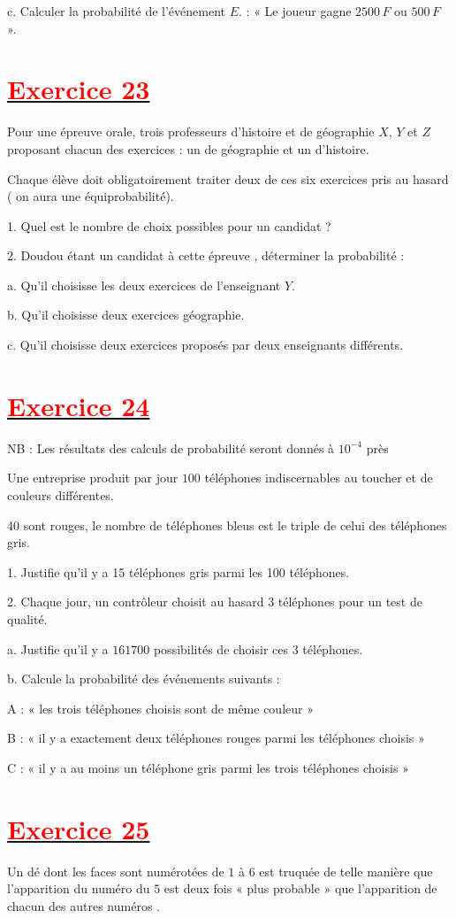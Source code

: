 \documentclass[12pt]{article}
\begin{document}
c. Calculer la probabilité de l'événement $E.$ : « Le joueur gagne $2500\,F$ ou $500\,F$ ».
\section*{\underline{\textbf{\textcolor{red}{Exercice 23}}}}
Pour une épreuve orale, trois professeurs d'histoire et de géographie $X$, $Y$ et $Z$ proposant chacun des exercices : un de géographie et un d'histoire.

Chaque élève doit obligatoirement traiter deux de ces six exercices pris au hasard ( on aura une équiprobabilité).

1. Quel est le nombre de choix possibles pour un candidat ?

2. Doudou étant un candidat à cette épreuve , déterminer la probabilité :

a. Qu'il choisisse les deux exercices de l'enseignant $Y.$

b. Qu'il choisisse deux exercices géographie.

c. Qu'il choisisse deux exercices proposés par deux enseignants différents.
\section*{\underline{\textbf{\textcolor{red}{Exercice 24}}}}
NB : Les résultats des calculs de probabilité seront donnés à $10^{-4}$ près

Une entreprise produit par jour $100$ téléphones indiscernables au toucher et de couleurs différentes.

40 sont rouges, le nombre de téléphones bleus est le triple de celui des téléphones gris.

1. Justifie qu'il y a 15 téléphones gris parmi les 100 téléphones.

2. Chaque jour, un contrôleur choisit au hasard $3$ téléphones pour un test de qualité.

a. Justifie qu'il y a $161700$ possibilités de choisir ces 3 téléphones.

b. Calcule la probabilité des événements suivants :

A : « les trois téléphones choisis sont de même couleur »

B : « il y a exactement deux téléphones rouges parmi les téléphones choisis »

C : « il y a au moins un téléphone gris parmi les trois téléphones choisis »
\section*{\underline{\textbf{\textcolor{red}{Exercice 25}}}}
Un dé dont les faces sont numérotées de $1$ à $6$ est truquée de telle manière que l'apparition du numéro du $5$ est deux fois « plus probable » que l'apparition de chacun des autres numéros .
\end{document}
